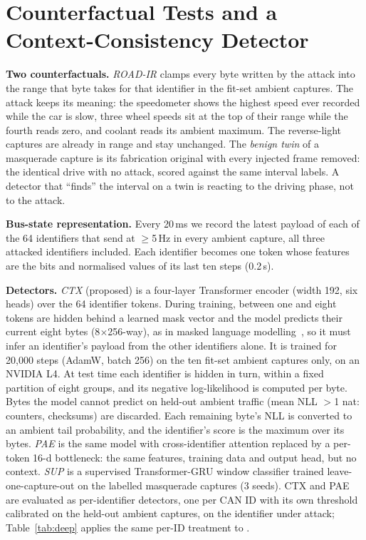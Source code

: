 \documentclass[conference]{IEEEtran}
\begin{document}
\section{Counterfactual Tests and a Context-Consistency Detector}
\label{sec:cf}
\textbf{Two counterfactuals.} \emph{ROAD-IR} clamps every byte written by the attack into the range that byte takes for that identifier in the fit-set ambient captures. The attack keeps its meaning: the speedometer shows the highest speed ever recorded while the car is slow, three wheel speeds sit at the top of their range while the fourth reads zero, and coolant reads its ambient maximum. The reverse-light captures are already in range and stay unchanged. The \emph{benign twin} of a masquerade capture is its fabrication original with every injected frame removed: the identical drive with no attack, scored against the same interval labels. A detector that ``finds'' the interval on a twin is reacting to the driving phase, not to the attack.

\textbf{Bus-state representation.} Every 20\,ms we record the latest payload of each of the 64 identifiers that send at $\geq$5\,Hz in every ambient capture, all three attacked identifiers included. Each identifier becomes one token whose features are the bits and normalised values of its last ten steps (0.2\,s).

\textbf{Detectors.} \emph{CTX} (proposed) is a four-layer Transformer encoder (width 192, six heads) over the 64 identifier tokens. During training, between one and eight tokens are hidden behind a learned mask vector and the model predicts their current eight bytes (8$\times$256-way), as in masked language modelling~\cite{devlin2019}, so it must infer an identifier's payload from the other identifiers alone. It is trained for 20{,}000 steps (AdamW, batch 256) on the ten fit-set ambient captures only, on an NVIDIA L4. At test time each identifier is hidden in turn, within a fixed partition of eight groups, and its negative log-likelihood is computed per byte. Bytes the model cannot predict on held-out ambient traffic (mean NLL $>$1 nat: counters, checksums) are discarded. Each remaining byte's NLL is converted to an ambient tail probability, and the identifier's score is the maximum over its bytes. \emph{PAE} is the same model with cross-identifier attention replaced by a per-token 16-d bottleneck: the same features, training data and output head, but no context. \emph{SUP} is a supervised Transformer-GRU window classifier trained leave-one-capture-out on the labelled masquerade captures (3 seeds). CTX and PAE are evaluated as per-identifier detectors, one per CAN ID with its own threshold calibrated on the held-out ambient captures, on the identifier under attack; Table~\ref{tab:deep} applies the same per-ID treatment to \Ttwo.
\end{document}
